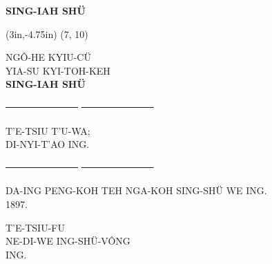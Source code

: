 \begin{titlepage}
	\vspace*{18ex}
	\begin{center}
		{\huge\bfseries\MakeUppercase{Sing-Iah Shü}}
	\end{center}
	
	\clearpage
	
	\thisfancyput(3in,-4.75in){
		\setlength{\unitlength}{1in}
		\oval(7, 10)
	}
	
	\begin{center}
		\MakeUppercase{
			{\Large ngô-he kyiu-cü}				\\[6.5ex]
			{\LARGE yia-su kyi-toh-keh}			\\[7.5ex]
			{\huge\bfseries Sing-Iah Shü}		\\
		}
		
		\vfill
		{\Large \sout{~~~~~~~~~~~~~~~}  \sout{~~~~~~~~~~~~~~~}}
		\vfill
		
		\MakeUppercase{
			{\LARGE t'e-tsiu t'u-wa;}			\\[6ex]
			{\large di-nyi-t'ao ing.}			\\
		}
		
		\vfill
		{\Large \sout{~~~~~~~~~~~~~~~}  \sout{~~~~~~~~~~~~~~~}}
		\vfill
		
		\MakeUppercase{
			{\large da-ing peng-koh teh nga-koh sing-shü we ing. \\[2ex]
					1897.
			}	
		}
	\end{center}
	
	\clearpage
	
	\vspace*{\fill}
	\begin{center}
		\MakeUppercase{
			t'e-tsiu-fu \\
			ne-di-we ing-shü-vông \\
			ing.
		}
	\end{center}
	\vspace*{\fill}
	
\end{titlepage}